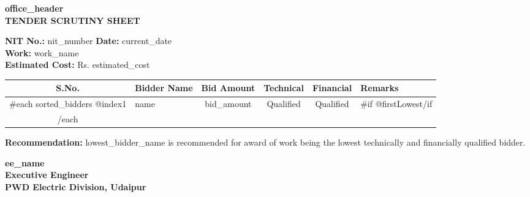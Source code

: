 \documentclass[12pt,a4paper]{article}
\begin{document}
\begin{center}
\textbf{{{office_header}}}\\[0.3cm]
\textbf{TENDER SCRUTINY SHEET}\\[0.2cm]
\end{center}

\vspace{0.5cm}

\noindent
\textbf{NIT No.:} {{nit_number}} \hfill \textbf{Date:} {{current_date}}\\
\textbf{Work:} {{work_name}}\\
\textbf{Estimated Cost:} Rs. {{estimated_cost}}

\vspace{0.5cm}

\begin{longtable}{|c|p{3cm}|c|c|c|p{2cm}|}
\hline
\textbf{S.No.} & \textbf{Bidder Name} & \textbf{Bid Amount} & \textbf{Technical} & \textbf{Financial} & \textbf{Remarks} \\
\hline
{{#each sorted_bidders}}
{{@index1}} & {{name}} & {{bid_amount}} & Qualified & Qualified & {{#if @first}}Lowest{{/if}} \\
\hline
{{/each}}
\end{longtable}

\vspace{0.5cm}

\noindent
\textbf{Recommendation:} {{lowest_bidder_name}} is recommended for award of work being the lowest technically and financially qualified bidder.

\vspace{1cm}

\noindent
\textbf{{{ee_name}}}\\
\textbf{Executive Engineer}\\
\textbf{PWD Electric Division, Udaipur}
\end{document}
